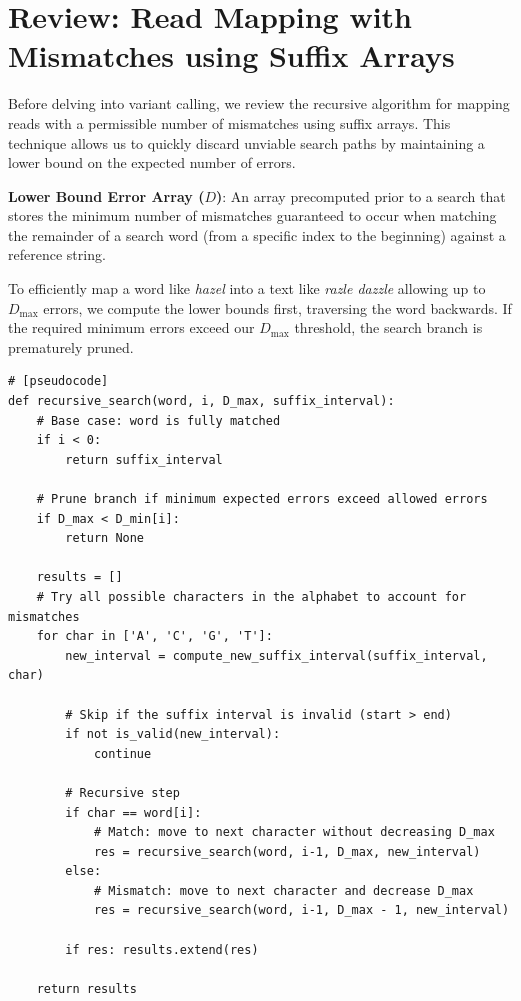 \documentclass[11pt,a4paper]{article}
\begin{document}

\section{Review: Read Mapping with Mismatches using Suffix Arrays}
Before delving into variant calling, we review the recursive algorithm for mapping reads with a permissible number of mismatches using suffix arrays. This technique allows us to quickly discard unviable search paths by maintaining a lower bound on the expected number of errors.

\begin{important}
    \textbf{Lower Bound Error Array ($D$)}: An array precomputed prior to a search that stores the minimum number of mismatches guaranteed to occur when matching the remainder of a search word (from a specific index to the beginning) against a reference string.
\end{important}

To efficiently map a word like \textit{hazel} into a text like \textit{razle dazzle} allowing up to $D_{\max}$ errors, we compute the lower bounds first, traversing the word backwards. If the required minimum errors exceed our $D_{\max}$ threshold, the search branch is prematurely pruned.

\begin{verbatim}
# [pseudocode]
def recursive_search(word, i, D_max, suffix_interval):
    # Base case: word is fully matched
    if i < 0:
        return suffix_interval
        
    # Prune branch if minimum expected errors exceed allowed errors
    if D_max < D_min[i]:
        return None 

    results = []
    # Try all possible characters in the alphabet to account for mismatches
    for char in ['A', 'C', 'G', 'T']:
        new_interval = compute_new_suffix_interval(suffix_interval, char)
        
        # Skip if the suffix interval is invalid (start > end)
        if not is_valid(new_interval):
            continue

        # Recursive step
        if char == word[i]:
            # Match: move to next character without decreasing D_max
            res = recursive_search(word, i-1, D_max, new_interval)
        else:
            # Mismatch: move to next character and decrease D_max
            res = recursive_search(word, i-1, D_max - 1, new_interval)
            
        if res: results.extend(res)
        
    return results
\end{verbatim}
\end{document}
